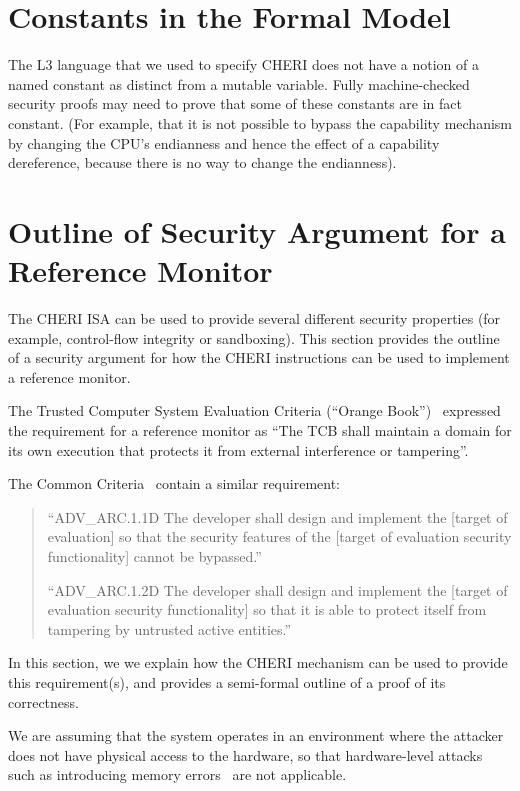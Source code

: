 \section{Constants in the Formal Model}

The L3 language that we used to specify CHERI does not have a notion of
a named constant as distinct from a mutable variable. Fully machine-checked
security proofs may need to prove that some of these constants are in fact
constant. (For example, that it is not possible to bypass the capability
mechanism by changing the CPU's endianness and hence the effect of a capability
dereference, because there is no way to change the endianness).

\section{Outline of Security Argument for a Reference Monitor}

The CHERI ISA can be used to provide several different security properties (for
example, control-flow integrity or sandboxing). This section provides the
outline of a security argument for how the CHERI instructions can be used
to implement a reference monitor.

The Trusted Computer System Evaluation Criteria (``Orange Book'')~\cite{TCSEC}
expressed the requirement for a reference monitor as ``The TCB shall maintain
a domain for its own execution that protects it from external interference or
tampering''.

The Common Criteria~\cite{CC2012-3} contain a similar requirement:

\begin{quote}
``ADV\_ARC.1.1D The developer shall design and implement the [target of
evaluation] so that the security features of the [target of evaluation
security functionality] cannot be bypassed.''

``ADV\_ARC.1.2D The developer shall design and implement the [target of
evaluation security functionality] so that it is able to protect itself from
tampering by untrusted active entities.''
\end{quote}

In this section, we we explain how the CHERI mechanism can be used
to provide this requirement(s), and provides a semi-formal outline of a
proof of its correctness.

We are assuming that the system operates in an environment where
the attacker does not have physical access to the hardware, so that
hardware-level attacks such as introducing memory errors~\cite{Govinda+03}
are not applicable.

